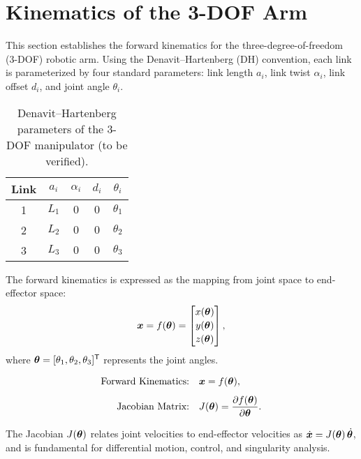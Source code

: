 ﻿%
\section{Kinematics of the 3-DOF Arm}\label{sec:kin}

This section establishes the forward kinematics for the three-degree-of-freedom (3-DOF) robotic arm. 
Using the Denavit--Hartenberg (DH) convention, each link is parameterized by four standard parameters: 
link length $a_i$, link twist $\alpha_i$, link offset $d_i$, and joint angle $\theta_i$.

\begin{table}[h]
  \centering
  \caption{Denavit--Hartenberg parameters of the 3-DOF manipulator (to be verified).}
  \label{tab:dh}
  \begin{tabular}{@{}ccccc@{}}
    \toprule
    \textbf{Link} & $a_i$ & $\alpha_i$ & $d_i$ & $\theta_i$ \\
    \midrule
    1 & $L_1$ & $0$ & $0$ & $\theta_1$ \\
    2 & $L_2$ & $0$ & $0$ & $\theta_2$ \\
    3 & $L_3$ & $0$ & $0$ & $\theta_3$ \\
    \bottomrule
  \end{tabular}
\end{table}

\noindent
The forward kinematics is expressed as the mapping from joint space to end-effector space:
\begin{equation}
  \bm{x} = f(\bm{\theta}) =
  \begin{bmatrix}
  x(\bm{\theta}) \\[2pt] y(\bm{\theta}) \\[2pt] z(\bm{\theta})
  \end{bmatrix},
\end{equation}
where $\bm{\theta} = [\theta_1, \theta_2, \theta_3]^{\mathsf{T}}$ represents the joint angles.

\begin{tcolorbox}[title=Kinematic Relations, colback=white!98!gray]
\begin{align*}
  \text{Forward Kinematics:} \quad & \bm{x} = f(\bm{\theta}), \\[4pt]
  \text{Jacobian Matrix:} \quad & J(\bm{\theta}) = 
  \frac{\partial f(\bm{\theta})}{\partial \bm{\theta}}.
\end{align*}
\end{tcolorbox}

The Jacobian $J(\bm{\theta})$ relates joint velocities to end-effector velocities as
$\dot{\bm{x}} = J(\bm{\theta})\,\dot{\bm{\theta}}$, and is fundamental for differential motion,
control, and singularity analysis.
